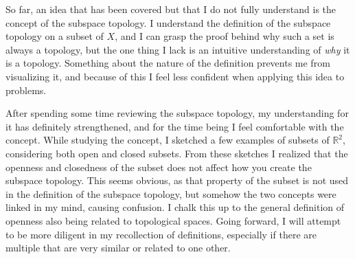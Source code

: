\documentclass[12pt]{article}
\newcommand{\R}{\mathbb{R}}
\begin{document}
\pagestyle{fancy}
\fancyhead{}

\normalsize

So far, an idea that has been covered but that I do not fully understand is the concept of the subspace topology. I understand the definition of the subspace topology on a subset of $X$, and I can grasp the proof behind why such a set is always a topology, but the one thing I lack is an intuitive understanding of \textit{why} it is a topology. Something about the nature of the definition prevents me from visualizing it, and because of this I feel less confident when applying this idea to problems.

After spending some time reviewing the subspace topology, my understanding for it has definitely strengthened, and for the time being I feel comfortable with the concept. While studying the concept, I sketched a few examples of subsets of $\R^2$, considering both open and closed subsets. From these sketches I realized that the openness and closedness of the subset does not affect how you create the subspace topology. This seems obvious, as that property of the subset is not used in the definition of the subspace topology, but somehow the two concepts were linked in my mind, causing confusion. I chalk this up to the general definition of openness also being related to topological spaces. Going forward, I will attempt to be more diligent in my recollection of definitions, especially if there are multiple that are very similar or related to one other.
\end{document}

